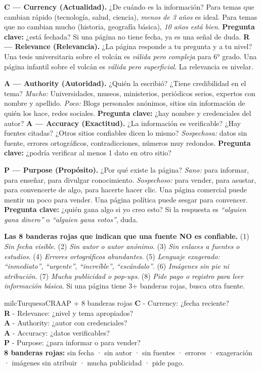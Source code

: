 \documentclass[11pt,letterpaper]{article}
\newcommand{\milcpaso}[3]{%
\Needspace{4\baselineskip}%
\begin{tcolorbox}[enhanced,colback=white,colframe=milcLinea,arc=1.5mm,boxrule=.9pt,
  left=14mm,right=4mm,top=3mm,bottom=3mm,before skip=4pt,after skip=4pt,
  fontupper=\RaggedRight,
  overlay={\node[anchor=north west,circle,fill=#2,text=white,inner sep=0pt,
    minimum size=7.4mm,font=\sffamily\bfseries\small]
    at ([xshift=3.6mm,yshift=-3.2mm]frame.north west) {#1};}]
#3
\end{tcolorbox}}
\begin{document}
\milcpaso{1}{milcTurquesa}{\textbf{C --- Currency (Actualidad).} ¿De cuándo es la información? Para temas que cambian rápido (tecnología, salud, ciencia), \emph{menos de 3 años} es ideal. Para temas que no cambian mucho (historia, geografía básica), \emph{10 años está bien}. \textbf{Pregunta clave:} ¿está fechada? Si una página no tiene fecha, ya es una señal de duda. \textbf{R --- Relevance (Relevancia).} ¿La página responde a tu pregunta y a tu nivel? Una tesis universitaria sobre el volcán es \emph{válida pero compleja} para 6° grado. Una página infantil sobre el volcán es \emph{válida pero superficial}. La relevancia es nivelar.}
\milcpaso{2}{milcTurquesa}{\textbf{A --- Authority (Autoridad).} ¿Quién la escribió? ¿Tiene credibilidad en el tema? \emph{Mucho:} Universidades, museos, ministerios, periódicos serios, expertos con nombre y apellido. \emph{Poco:} Blogs personales anónimos, sitios sin información de quién los hace, redes sociales. \textbf{Pregunta clave:} ¿hay nombre y credenciales del autor? \textbf{A --- Accuracy (Exactitud).} ¿La información es verificable? ¿Hay fuentes citadas? ¿Otros sitios confiables dicen lo mismo? \emph{Sospechosa:} datos sin fuente, errores ortográficos, contradicciones, números muy redondos. \textbf{Pregunta clave:} ¿podría verificar al menos 1 dato en otro sitio?}
\milcpaso{3}{milcTurquesa}{\textbf{P --- Purpose (Propósito).} ¿Por qué existe la página? \emph{Sano:} para informar, para enseñar, para divulgar conocimiento. \emph{Sospechoso:} para vender, para asustar, para convencerte de algo, para hacerte hacer clic. Una página comercial puede mentir un poco para vender. Una página política puede sesgar para convencer. \textbf{Pregunta clave:} ¿quién gana algo si yo creo esto? Si la respuesta es \emph{``alguien gana dinero''} o \emph{``alguien gana votos''}, duda.}
\milcpaso{4}{milcTurquesa}{\textbf{Las 8 banderas rojas que indican que una fuente NO es confiable.} (1) \emph{Sin fecha visible}. (2) \emph{Sin autor o autor anónimo}. (3) \emph{Sin enlaces a fuentes o estudios}. (4) \emph{Errores ortográficos abundantes}. (5) \emph{Lenguaje exagerado:} \emph{``inmediato''}, \emph{``urgente''}, \emph{``increíble''}, \emph{``escándalo''}. (6) \emph{Imágenes sin pie ni atribución}. (7) \emph{Mucha publicidad o pop-ups}. (8) \emph{Pide pago o registro para leer información básica}. Si una página tiene 3+ banderas rojas, busca otra fuente.}

\begin{drawbox}{milcTurquesa}{CRAAP + 8 banderas rojas}
\textbf{C} - Currency: ¿fecha reciente? \\[1mm]
\textbf{R} - Relevance: ¿nivel y tema apropiados? \\[1mm]
\textbf{A} - Authority: ¿autor con credenciales? \\[1mm]
\textbf{A} - Accuracy: ¿datos verificables? \\[1mm]
\textbf{P} - Purpose: ¿para informar o para vender? \\[1mm]
\textbf{8 banderas rojas:} sin fecha · sin autor · sin fuentes · errores · exageración · imágenes sin atribuir · mucha publicidad · pide pago.
\end{drawbox}
\end{document}
